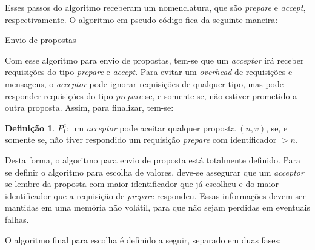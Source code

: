 \documentclass[
    12pt,
    openright, 
    oneside,
    a4paper,
    french,
    english,
    brazil
    ]{facom-ufu-abntex2}
\theoremstyle{definition}
\newtheorem{definition}{Definição}
\begin{document}
Esses passos do algoritmo receberam um nomenclatura, que são \emph{prepare} e
\emph{accept}, respectivamente. O algoritmo em pseudo-código fica da seguinte maneira:

\begin{algorithm}[H]
\caption{Envio de propostas}
\SetAlgoLined
{}
\end{algorithm}

Com esse algoritmo para envio de propostas, tem-se que um \emph{acceptor} irá
receber requisições do tipo \emph{prepare} e \emph{accept}. Para evitar um \emph{overhead}
de requisições e mensagens, o \emph{acceptor} pode ignorar requisições de qualquer tipo,
mas pode responder requisições do tipo \emph{prepare} se, e somente se, não estiver
prometido a outra proposta. Assim, para finalizar, tem-se:

\begin{definition}
$P_1^a$: um \emph{acceptor} pode aceitar qualquer proposta $(n, v)$, se, e somente se, não tiver
respondido um requisição \emph{prepare} com identificador $>n$.
\end{definition}

Desta forma, o algoritmo para envio de proposta está totalmente definido. Para se definir
o algoritmo para escolha de valores, deve-se assegurar que um \emph{acceptor} se
lembre da proposta com maior identificador que já escolheu e do maior identificador
que a requisição de \emph{prepare} respondeu. Essas informações devem ser mantidas
em uma memória não volátil, para que não sejam perdidas em eventuais falhas.

O algoritmo final para escolha é definido a seguir, separado em duas fases:
\end{document}
